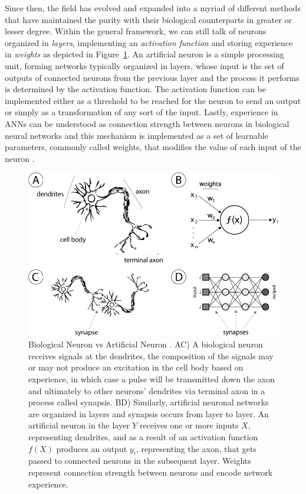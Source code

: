 Since then, the field has evolved and expanded into a myriad of different methods that have maintained the purity with their biological counterparts in greater or lesser degree.
Within the general framework, we can still talk of neurons organized in \emph{layers}, implementing an \emph{activation function} and storing experience in \emph{weights} as depicted in Figure~\ref{fig:sec:theory:neurons}.
An artificial neuron is a simple processing unit, forming networks typically organized in layers, whose input is the set of outputs of connected neurons from the previous layer and the process it performs is determined by the activation function.
The activation function can be implemented either as a threshold to be reached for the neuron to send an output or simply as a transformation of any sort of the input.
Lastly, experience in ANNs can be understood as connection strength between neurons in biological neural networks and this mechanism is implemented as a set of learnable parameters, commonly called weights, that modifies the value of each input of the neuron \cite{Hinton1990}.

\begin{figure}[htb]
  \includegraphics[width=\textwidth]{gfx/neurons}
  \caption{Biological Neuron vs Artificial Neuron \cite{Honorio2013}.
    AC) A biological neuron receives signals at the dendrites, the composition of the signals may or may not produce an excitation in the cell body based on experience, in which case a pulse will be transmitted down the axon and ultimately to other neurons' dendrites via terminal axon in a process called synapsis.
    BD) Similarly, artificial neuronal networks are organized in layers and synapsis occurs from layer to layer.
    An artificial neuron in the layer $Y$ receives one or more inputs $X$, representing dendrites, and as a result of an activation function $f(X)$ produces an output $y_i$, representing the axon, that gets passed to connected neurons in the subsequent layer.
    Weights represent connection strength between neurons and encode network experience.}
  \label{fig:sec:theory:neurons}
\end{figure}

